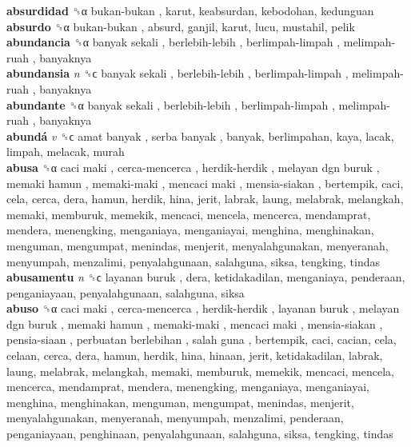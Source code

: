 \textbf{absurdidad} ␝α   bukan-bukan , karut, keabsurdan, kebodohan, kedunguan  \\
\textbf{absurdo} ␝α   bukan-bukan , absurd, ganjil, karut, lucu, mustahil, pelik  \\
\textbf{abundancia} ␝α   banyak sekali ,  berlebih-lebih ,  berlimpah-limpah ,  melimpah-ruah , banyaknya  \\
\textbf{abundansia} \emph{n}  ␝ϲ   banyak sekali ,  berlebih-lebih ,  berlimpah-limpah ,  melimpah-ruah , banyaknya  \\
\textbf{abundante} ␝α   banyak sekali ,  berlebih-lebih ,  berlimpah-limpah ,  melimpah-ruah , banyaknya  \\
\textbf{abundá} \emph{v}  ␝ϲ   amat banyak ,  serba banyak , banyak, berlimpahan, kaya, lacak, limpah, melacak, murah  \\
\textbf{abusa} ␝α   caci maki ,  cerca-mencerca ,  herdik-herdik ,  melayan dgn buruk ,  memaki hamun ,  memaki-maki ,  mencaci maki ,  mensia-siakan , bertempik, caci, cela, cerca, dera, hamun, herdik, hina, jerit, labrak, laung, melabrak, melangkah, memaki, memburuk, memekik, mencaci, mencela, mencerca, mendamprat, mendera, menengking, menganiaya, menganiayai, menghina, menghinakan, menguman, mengumpat, menindas, menjerit, menyalahgunakan, menyeranah, menyumpah, menzalimi, penyalahgunaan, salahguna, siksa, tengking, tindas  \\
\textbf{abusamentu} \emph{n}  ␝ϲ   layanan buruk , dera, ketidakadilan, menganiaya, penderaan, penganiayaan, penyalahgunaan, salahguna, siksa  \\
\textbf{abuso} ␝α   caci maki ,  cerca-mencerca ,  herdik-herdik ,  layanan buruk ,  melayan dgn buruk ,  memaki hamun ,  memaki-maki ,  mencaci maki ,  mensia-siakan ,  pensia-siaan ,  perbuatan berlebihan ,  salah guna , bertempik, caci, cacian, cela, celaan, cerca, dera, hamun, herdik, hina, hinaan, jerit, ketidakadilan, labrak, laung, melabrak, melangkah, memaki, memburuk, memekik, mencaci, mencela, mencerca, mendamprat, mendera, menengking, menganiaya, menganiayai, menghina, menghinakan, menguman, mengumpat, menindas, menjerit, menyalahgunakan, menyeranah, menyumpah, menzalimi, penderaan, penganiayaan, penghinaan, penyalahgunaan, salahguna, siksa, tengking, tindas  \\
